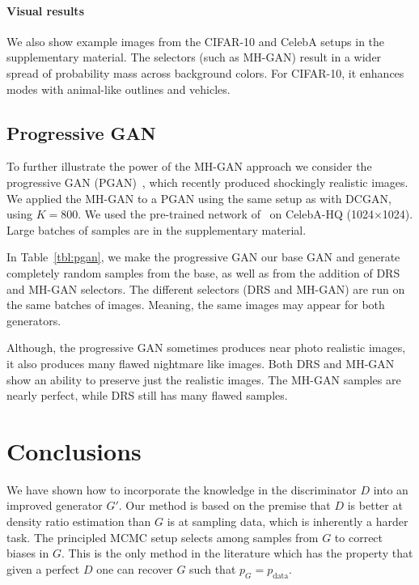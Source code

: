 \documentclass{article}
\newcommand{\PG}{{p_G}}
\newcommand{\PR}{{p_{\textrm{data}}}}
\begin{document}
\paragraph{Visual results}
We also show example images from the CIFAR-10 and CelebA setups in the supplementary material.
The selectors (such as MH-GAN) result in a wider spread of probability mass across background colors.
For CIFAR-10, it enhances modes with animal-like outlines and vehicles.

\subsection{Progressive GAN}

To further illustrate the power of the MH-GAN approach we consider the progressive GAN (PGAN)~\citep{Karras2017}, which recently produced shockingly realistic images.
We applied the MH-GAN to a PGAN using the same setup as with DCGAN, using $K=800$.
We used the pre-trained network of~\citet{Karras2017} on CelebA-HQ (1024$\times$1024)\@.
Large batches of samples are in the supplementary material.

In Table~\ref{tbl:pgan}, we make the progressive GAN our base GAN and generate completely random samples from the base, as well as from the addition of DRS and MH-GAN selectors.
The different selectors (DRS and MH-GAN) are run on the same batches of images.
Meaning, the same images may appear for both generators.

Although, the progressive GAN sometimes produces near photo realistic images, it also produces many flawed nightmare like images.
Both DRS and MH-GAN show an ability to preserve just the realistic images.
The MH-GAN samples are nearly perfect, while DRS still has many flawed samples.

\section{Conclusions}
\label{sec:conclusions}

We have shown how to incorporate the knowledge in the discriminator $D$ into an improved generator $G'$.
Our method is based on the premise that $D$ is better at density ratio estimation than $G$ is at sampling data, which is inherently a harder task.
The principled MCMC setup selects among samples from $G$ to correct biases in $G$.
This is the only method in the literature which has the property that given a perfect $D$ one can recover $G$ such that $\PG = \PR$.
\end{document}
